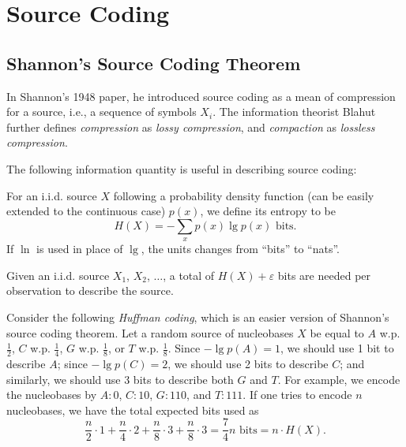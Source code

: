 \section{Source Coding}

\subsection{Shannon's Source Coding Theorem}
In Shannon's 1948 paper, he introduced source coding as a mean of compression for a source, i.e., a sequence of symbols $X_i$. The information theorist Blahut further defines \textit{compression} as \textit{lossy compression}, and \textit{compaction} as \textit{lossless compression}.

The following information quantity is useful in describing source coding:
\begin{definition}[Entropy]
    For an i.i.d. source $X$ following a probability density function (can be easily extended to the continuous case) $p(x)$, we define its entropy to be
    \begin{equation}
        H(X) = -\sum_{x}p(x)\lg p(x) \text{ bits.}
    \end{equation}
    If $\ln$ is used in place of $\lg$, the units changes from ``bits'' to ``nats''.
\end{definition}
\begin{theorem}
    Given an i.i.d. source $X_1$, $X_2$, $\ldots$, a total of $H(X)+\varepsilon$ bits are needed per observation to describe the source.
\end{theorem}
\begin{example}
    Consider the following \textit{Huffman coding}, which is an easier version of Shannon's source coding theorem. Let a random source of nucleobases $X$ be equal to $A$ w.p. $\frac{1}{2}$, $C$ w.p. $\frac{1}{4}$, $G$ w.p. $\frac{1}{8}$, or $T$ w.p. $\frac{1}{8}$. Since $-\lg p(A) = 1$, we should use 1 bit to describe $A$; since $-\lg p(C) = 2$, we should use 2 bits to describe $C$; and similarly, we should use 3 bits to describe both $G$ and $T$. For example, we encode the nucleobases by $A:0$, $C:10$, $G:110$, and $T:111$. If one tries to encode $n$ nucleobases, we have the total expected bits used as
    \begin{equation*}
        \frac{n}{2}\cdot1 + \frac{n}{4}\cdot2 + \frac{n}{8}\cdot 3 + \frac{n}{8}\cdot3 = \frac{7}{4}n \text{ bits} = n\cdot H(X).
    \end{equation*}
\end{example}

